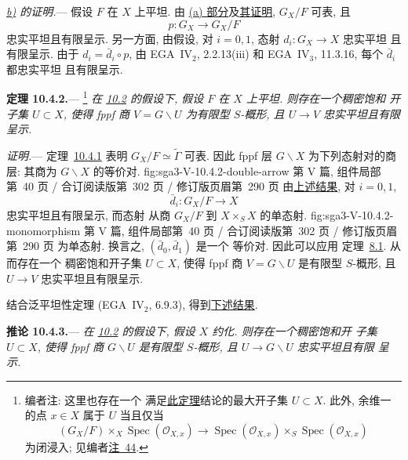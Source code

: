 \medskip
{}\label{proof:sga3-V-10.4.1-b}%
\noindent\textit{\hyperref[thm:sga3-V-10.4.1-b]{b)} 的证明.}---
假设 \(F\) 在 \(X\) 上平坦. 由 \hyperref[thm:sga3-V-10.4.1-a]{(a) 部分}及\hyperref[proof:sga3-V-10.4.1-a]{其证明}, \(G_X/F\)
可表, 且
\[
  p:G_X\longrightarrow G_X/F
\]
忠实平坦且有限呈示. 另一方面,
由假设, 对 \(i=0,1\), 态射 \(d_i:G_X\to X\) 忠实平坦
且有限呈示. 由于
\(d_i=\bar d_i\circ p\), 由 EGA~IV\(_2\), 2.2.13(iii)
和 EGA~IV\(_3\), 11.3.16, 每个 \(\bar d_i\) 都忠实平坦
且有限呈示.

\medskip
{}\label{thm:sga3-V-10.4.2}%
\noindent\textbf{定理 10.4.2.}---%
\footnote{\label{note:sga3-V-52}编者注: 这里也存在一个
满足\hyperref[thm:sga3-V-10.4.2]{此定理}结论的最大开子集 \(U\subset X\).
此外, 余维一的点 \(x\in X\) 属于
\(U\) 当且仅当
\[
  (G_X/F)\times_X\operatorname{Spec}(\mathcal O_{X,x})
  \longrightarrow
  \operatorname{Spec}(\mathcal O_{X,x})
  \times_S\operatorname{Spec}(\mathcal O_{X,x})
\]
为闭浸入; 见编者\hyperref[note:sga3-V-44]{注~44}.}
\textit{在 \hyperref[sec:sga3-V-10.2]{10.2} 的假设下,
假设 \(F\) 在 \(X\) 上平坦. 则存在一个稠密饱和
开子集 \(U\subset X\), 使得 fppf 商
\(V=G\backslash U\) 为有限型 \(S\)-概形, 且
\(U\to V\) 忠实平坦且有限呈示.}

\medskip
\noindent\textit{证明.}---
定理~\hyperref[thm:sga3-V-10.4.1]{10.4.1} 表明
\(G_X/F\simeq\widetilde\Gamma\) 可表. 因此 fppf 层
\(G\backslash X\) 为下列态射对的商层:
  {其商为 \(G\backslash X\) 的等价对.}
  {fig:sga3-V-10.4.2-double-arrow}
  {第 V 篇, 组件局部第~40 页 / 合订阅读版第~302 页 /
   修订版页眉第~290 页}
由\hyperref[thm:sga3-V-10.4.1-b]{上述结果}, 对 \(i=0,1\),
\[
  \bar d_i:G_X/F\longrightarrow X
\]
忠实平坦且有限呈示, 而态射
  {从商 \(G_X/F\) 到 \(X\times_SX\) 的单态射.}
  {fig:sga3-V-10.4.2-monomorphism}
  {第 V 篇, 组件局部第~40 页 / 合订阅读版第~302 页 /
   修订版页眉第~290 页}
为单态射. 换言之, \((\bar d_0,\bar d_1)\) 是一个
等价对. 因此可以应用
定理~\hyperref[thm:sga3-V-8.1]{8.1}. 从而存在一个
稠密饱和开子集 \(U\subset X\), 使得 fppf 商
\(V=G\backslash U\) 是有限型 \(S\)-概形, 且 \(U\to V\)
忠实平坦且有限呈示.

结合泛平坦性定理
(EGA~IV\(_2\), 6.9.3), 得到\hyperref[cor:sga3-V-10.4.3]{下述结果}.

\medskip
{}\label{cor:sga3-V-10.4.3}%
\noindent\textbf{推论 10.4.3.}---
\textit{在 \hyperref[sec:sga3-V-10.2]{10.2} 的假设下,
假设 \(X\) 约化. 则存在一个稠密饱和开
子集 \(U\subset X\), 使得 fppf 商
\(G\backslash U\) 是有限型 \(S\)-概形, 且
\(U\to G\backslash U\) 忠实平坦且有限
呈示.}

